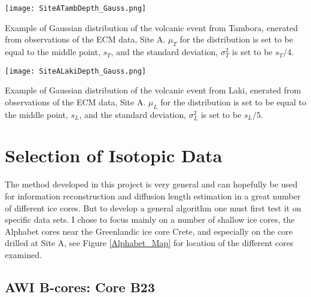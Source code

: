 \documentclass[../../CompleteThesis2/Complete_2ndDraft]{subfiles}
\begin{document}
\begin{marginfigure}
	\centering
	\texttt{[image: SiteATambDepth\_Gauss.png]}
	\caption[Corrected Tambora event, Site A.]{\footnotesize Example of Gaussian distribution of the volcanic event from Tambora,  enerated from observations of the ECM data, Site A. $\mu_T$ for the distribution is set to be equal to the middle point, $s_T$, and the standard deviation, $\sigma_T^2$ is set to be $s_T/4$.}
	\label{Fig:DATA_SiteA_TambDepth_Gauss}
\end{marginfigure}


\begin{marginfigure}
	\centering
	\texttt{[image: SiteALakiDepth\_Gauss.png]}
	\caption[Corrected Laki event, Site A.]{\footnotesize Example of Gaussian distribution of the volcanic event from Laki,  enerated from observations of the ECM data, Site A. $\mu_L$ for the distribution is set to be equal to the middle point, $s_L$, and the standard deviation, $\sigma_L^2$ is set to be $s_L/5$.}
	\label{Fig:DATA_SiteA_LakiDepth_Gauss}
\end{marginfigure}



\section[Selection][Selection]{Selection of Isotopic Data}
\label{Sec:Data_Selection}


The method developed in this project is very general and can hopefully be used for information reconstruction and diffusion length estimation in a great number of different ice cores. But to develop a general algorithm one must first test it on specific data sets. I chose to focus mainly on a number of shallow ice cores, the Alphabet cores near the Greenlandic ice core Crete, and especially on the core drilled at Site A, see Figure \ref{Alphabet_Map} for location of the different cores examined.

\subsection[AWI B-cores]{AWI B-cores: Core B23}
\label{Subsec:Data_Selection_Bcores}
\end{document}
